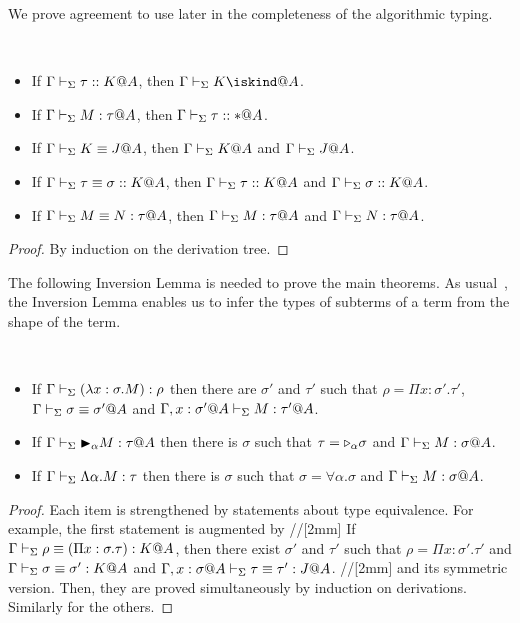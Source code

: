 
We prove agreement to use later in the completeness of the algorithmic typing.

\begin{lemma}[Agreement]\
    \label{lemma:Agreement}
    \begin{itemize}
        \item If \(\Gamma\vdash_\Sigma \tau::K@A\), then \(\G\V K \iskind@A \).
        \item If \(\G\V M:\tau@A\), then \(\Gamma\vdash_\Sigma \tau::*@A\).
        \item If \(\Gamma\vdash_\Sigma K\equiv J@A\), then \(\Gamma\vdash_\Sigma K @A\) and \(\Gamma\vdash_\Sigma J @A\).
        \item If \(\Gamma\vdash_\Sigma \tau\equiv \sigma :: K@A\), then \(\Gamma\vdash_\Sigma \tau::K@A\) and \(\Gamma\vdash_\Sigma \sigma::K@A\).
        \item If \(\G\V M\E N : \tau@A\), then \(\G\V M:\tau@A\) and \(\G\V N:\tau@A\).
    \end{itemize}
\end{lemma}
\begin{proof}
    By induction on the derivation tree.
\end{proof}



The following Inversion Lemma is needed to prove the main theorems.  As
usual~\cite{TAPL}, the Inversion Lemma enables us to infer the types of
subterms of a term from the shape of the term.

\begin{lemma}[Inversion]\ 
	\begin{itemize}
		\item If $\Gamma \vdash_\Sigma (\lambda x:\sigma.M) : \rho$ then there are $\sigma'$ and $\tau'$ such that
		      $\rho = \Pi x:\sigma'.\tau'$, $\Gamma \vdash_\Sigma \sigma \equiv \sigma'@A$ and $\Gamma ,x:\sigma'@A\vdash_\Sigma M:\tau'@A$.
		\item If $\G \V \TB_\alpha M : \tau@A$ then 
		      there is $\sigma$ such that $\tau = {\mathop{\triangleright}}_\alpha \sigma$ and $\G \V M : \sigma@A$.
		  \item If $\Gamma \vdash_\Sigma \Lambda\alpha.M : \tau$ then 
		  there is $\sigma$ such that $\sigma = \forall\alpha.\sigma$ and $\G \V M : \sigma@A$.%
	\end{itemize}
\end{lemma}

\begin{proof}
  Each item is strengthened by statements about type equivalence.
    For example, the first statement is augmented by //[2mm]
      If ${\Gamma \vdash_\Sigma \rho \equiv (\Pi x:\sigma.\tau) : K @A}$, then there exist
      $\sigma'$ and $\tau'$ such that ${\rho = \Pi x:\sigma'.\tau'}$ and
      ${\Gamma \vdash_\Sigma \sigma \equiv \sigma' : K @A}$ and
      ${\G, x:\sigma@A\V \tau \E \tau' : J @A}$. //[2mm]
  and its symmetric version. Then, they are proved simultaneously by induction
    on derivations. Similarly for the others.
\end{proof}

